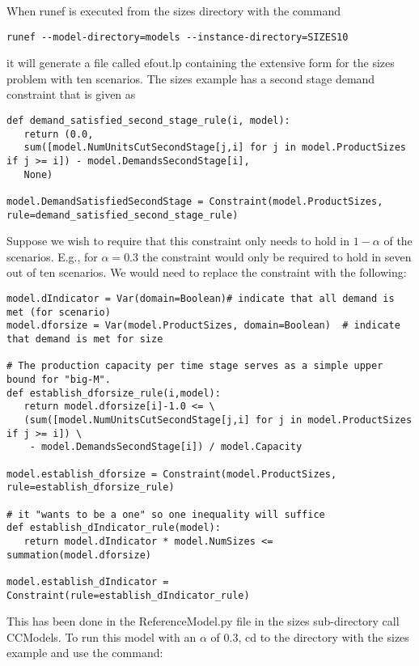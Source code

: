 When runef is executed from the sizes directory with the command

\begin{verbatim}
runef --model-directory=models --instance-directory=SIZES10
\end{verbatim}

it will generate a file called efout.lp containing the extensive form for the sizes problem with
ten scenarios. The sizes example has a second stage demand constraint that is given as

\begin{verbatim}
def demand_satisfied_second_stage_rule(i, model):
   return (0.0, 
   sum([model.NumUnitsCutSecondStage[j,i] for j in model.ProductSizes if j >= i]) - model.DemandsSecondStage[i], 
   None)    

model.DemandSatisfiedSecondStage = Constraint(model.ProductSizes, rule=demand_satisfied_second_stage_rule)
\end{verbatim}

Suppose we wish to require that this constraint only needs to hold in $1-\alpha$ of the scenarios. E.g., for
$\alpha=0.3$ the constraint would only be required to hold in seven out of ten scenarios. We would
need to replace the constraint with the following:

\begin{verbatim}
model.dIndicator = Var(domain=Boolean)# indicate that all demand is met (for scenario)
model.dforsize = Var(model.ProductSizes, domain=Boolean)  # indicate that demand is met for size

# The production capacity per time stage serves as a simple upper bound for "big-M".
def establish_dforsize_rule(i,model):
   return model.dforsize[i]-1.0 <= \
   (sum([model.NumUnitsCutSecondStage[j,i] for j in model.ProductSizes if j >= i]) \
    - model.DemandsSecondStage[i]) / model.Capacity

model.establish_dforsize = Constraint(model.ProductSizes, rule=establish_dforsize_rule)

# it "wants to be a one" so one inequality will suffice
def establish_dIndicator_rule(model):
   return model.dIndicator * model.NumSizes <= summation(model.dforsize)

model.establish_dIndicator = Constraint(rule=establish_dIndicator_rule)
\end{verbatim}

This has been done in the ReferenceModel.py file in the sizes sub-directory call CCModels.
To run this model with an $\alpha$ of 0.3, cd to the directory with the sizes
example and use the command:

